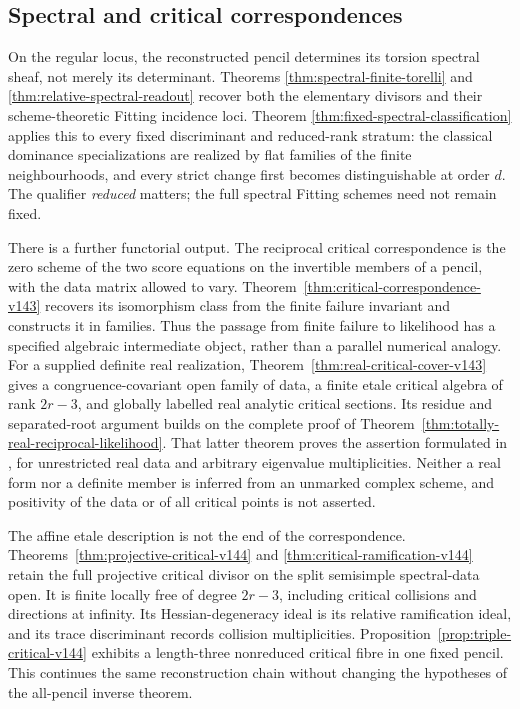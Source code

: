 \subsection{Spectral and critical correspondences}
On the regular locus, the reconstructed pencil determines its torsion
spectral sheaf, not merely its determinant.  Theorems
\ref{thm:spectral-finite-torelli} and
\ref{thm:relative-spectral-readout} recover both the elementary
divisors and their scheme-theoretic Fitting incidence loci.  Theorem
\ref{thm:fixed-spectral-classification} applies this to every fixed
discriminant and reduced-rank stratum: the classical dominance
specializations are realized by flat families of the finite
neighbourhoods, and every strict change first becomes distinguishable
at order \(d\).  The qualifier \emph{reduced} matters; the full
spectral Fitting schemes need not remain fixed.

There is a further functorial output.  The reciprocal critical
correspondence is the zero scheme of the two score equations on the
invertible members of a pencil, with the data matrix allowed to vary.
Theorem~\ref{thm:critical-correspondence-v143} recovers its isomorphism
class from the finite failure invariant and constructs it in families.
Thus the passage from finite failure to likelihood has a specified
algebraic intermediate object, rather than a parallel numerical
analogy.  For a supplied definite real realization,
Theorem~\ref{thm:real-critical-cover-v143} gives a congruence-covariant
open family of data, a finite etale critical algebra of rank \(2r-3\),
and globally labelled real analytic critical sections.  Its residue
and separated-root argument builds on the complete proof of
Theorem~\ref{thm:totally-real-reciprocal-likelihood}.  That latter
theorem proves the assertion formulated in
\cite[Conjecture~4.5]{FevolaMandelshtamSturmfels}, for unrestricted
real data and arbitrary eigenvalue multiplicities.  Neither a real
form nor a definite member is inferred from an unmarked complex
scheme, and positivity of the data or of all critical points is not
asserted.

The affine etale description is not the end of the correspondence.
Theorems~\ref{thm:projective-critical-v144} and
\ref{thm:critical-ramification-v144} retain the full projective critical
divisor on the split semisimple spectral-data open.  It is finite
locally free of degree \(2r-3\), including critical collisions and
directions at infinity.  Its Hessian-degeneracy ideal is its relative
ramification ideal, and its trace discriminant records collision
multiplicities.  Proposition~\ref{prop:triple-critical-v144} exhibits
a length-three nonreduced critical fibre in one fixed pencil.  This
continues the same reconstruction chain without changing the
hypotheses of the all-pencil inverse theorem.

